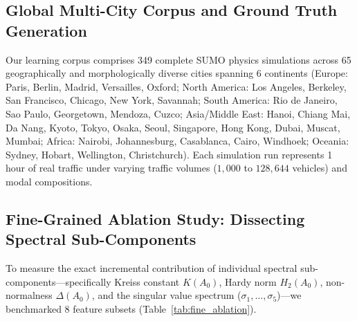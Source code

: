\documentclass[lettersize,journal]{IEEEtran}
\begin{document}
\subsection{Global Multi-City Corpus and Ground Truth Generation}
Our learning corpus comprises 349 complete SUMO physics simulations across 65 geographically and morphologically diverse cities spanning 6 continents (Europe: Paris, Berlin, Madrid, Versailles, Oxford; North America: Los Angeles, Berkeley, San Francisco, Chicago, New York, Savannah; South America: Rio de Janeiro, Sao Paulo, Georgetown, Mendoza, Cuzco; Asia/Middle East: Hanoi, Chiang Mai, Da Nang, Kyoto, Tokyo, Osaka, Seoul, Singapore, Hong Kong, Dubai, Muscat, Mumbai; Africa: Nairobi, Johannesburg, Casablanca, Cairo, Windhoek; Oceania: Sydney, Hobart, Wellington, Christchurch). Each simulation run represents 1 hour of real traffic under varying traffic volumes ($1,000$ to $128,644$ vehicles) and modal compositions.

\subsection{Fine-Grained Ablation Study: Dissecting Spectral Sub-Components}
To measure the exact incremental contribution of individual spectral sub-components—specifically Kreiss constant $K(A_0)$, Hardy norm $H_2(A_0)$, non-normalness $\Delta(A_0)$, and the singular value spectrum ($\sigma_1, \dots, \sigma_5$)—we benchmarked 8 feature subsets (Table~\ref{tab:fine_ablation}).
\end{document}
